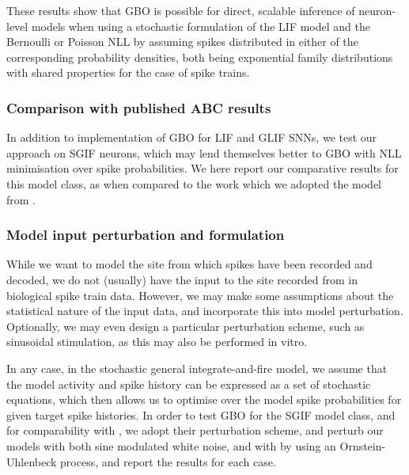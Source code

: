 \documentclass[mphil,deptreport,ianc]{infthesis} %
\begin{document}
These results show that GBO is possible for direct, scalable inference of neuron-level models when using a stochastic formulation of the LIF model and the Bernoulli or Poisson NLL by assuming spikes distributed in either of the corresponding probability densities, both being exponential family distributions with shared properties for the case of spike trains.



\subsubsection{Comparison with published ABC results}

In addition to implementation of GBO for LIF and GLIF SNNs, we test our approach on SGIF neurons, which may lend themselves better to GBO with NLL minimisation over spike probabilities. We here report our comparative results for this model class, as when compared to the work which we adopted the model from \cite{Rene2020}.

\subsubsection{Model input perturbation and formulation}

While we want to model the site from which spikes have been recorded and decoded, we do not (usually) have the input to the site recorded from in biological spike train data.
However, we may make some assumptions about the statistical nature of the input data, and incorporate this into model perturbation. Optionally, we may even design a particular perturbation scheme, such as sinusoidal stimulation, as this may also be performed in vitro.

In any case, in the stochastic general integrate-and-fire model, we assume that the model activity and spike history can be expressed as a set of stochastic equations, which then allows us to optimise over the model spike probabilities for given target spike histories.
In order to test GBO for the SGIF model class, and for comparability with \cite{Rene2020}, we adopt their perturbation scheme, and perturb our models with both sine modulated white noise, and with by using an Ornstein-Uhlenbeck process, and report the results for each case.
\end{document}
